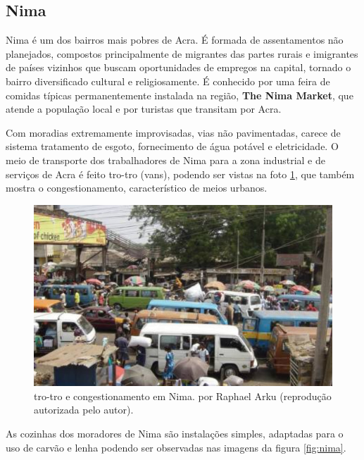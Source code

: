 \newpage
\subsection{Nima}

Nima é um dos bairros mais pobres de Acra. É formada de assentamentos não 
planejados, compostos principalmente de migrantes das partes rurais e 
imigrantes de países vizinhos que buscam oportunidades de empregos na capital, 
tornado o bairro diversificado cultural e religiosamente. É conhecido por uma 
feira de comidas típicas permanentemente instalada na região,
\textbf{The Nima Market}, que atende a população local e por turistas que 
transitam por Acra.

Com moradias extremamente improvisadas, vias não pavimentadas, carece de 
sistema tratamento de esgoto, fornecimento de água potável e eletricidade. 
O meio de transporte dos trabalhadores de Nima para a zona industrial e de 
serviços de Acra é feito tro-tro (vans), podendo ser vistas na foto 
\ref{fig:nima_tro}, que também mostra o congestionamento, característico de 
meios urbanos.  

\begin{figure}[H]
  \centering
    \includegraphics[width=0.5\linewidth]{../inputs/images/zheng/arku4.jpeg}
    \caption{tro-tro e congestionamento em Nima. por Raphael Arku 
           (reprodução autorizada pelo autor). \label{fig:nima_tro}}
\end{figure}

As cozinhas dos moradores de Nima são instalações simples, adaptadas para o uso
de carvão e lenha podendo ser observadas nas imagens da figura \ref{fig:nima}.

